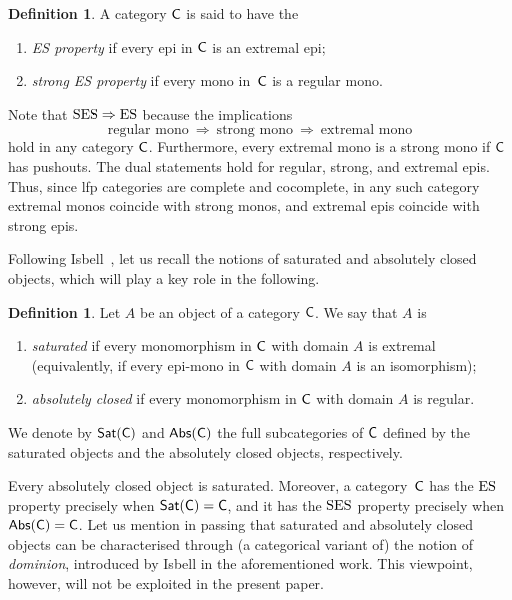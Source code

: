 \documentclass[a4paper,10pt,reqno]{amsart}
\theoremstyle{definition}
\newtheorem{definition}[theorem]{Definition}
\theoremstyle{remark}
\newcommand{\cat}{{\sf C}}								%
\newcommand{\Sat}{{\sf Sat}}								%
\newcommand{\Abs}{{\sf Abs}}								%
\newcommand{\IMP}{\Rightarrow}						%
\newcommand{\ES}{\textnormal{ES}}
\newcommand{\SES}{\textnormal{SES}}
\begin{document}
\begin{definition}\label{d:ES-and-SES}
A category $\cat$ is said to have the
\begin{enumerate}
\item[(\ES)]\label{ES} \emph{ES property} if every epi in $\cat$ is an extremal epi;
\item[(\SES)]\label{SES} \emph{strong ES property} if every mono in~$\cat$ is a regular mono.
\end{enumerate}
\end{definition}

Note that $\SES\IMP\ES$ because the implications
\[
\text{regular mono} \ \IMP \ \text{strong mono} \ \IMP \ \text{extremal mono}
\]
hold in any category $\cat$. Furthermore, every extremal mono is a strong mono if $\cat$ has pushouts. The dual statements hold for regular, strong, and extremal epis. Thus, since lfp categories are complete and cocomplete, in any such category extremal monos coincide with strong monos, and extremal epis coincide with strong epis.


Following Isbell~\cite{Isbell1966}, let us recall the notions of saturated and absolutely closed objects, which will play a key role in the following.

\begin{definition}
Let $A$ be an object of a category $\cat$. We say that $A$ is
\begin{enumerate}[label=(\roman*)]
\item \emph{saturated} if every monomorphism in $\cat$ with domain $A$ is extremal (equivalently, if every epi-mono in $\cat$ with domain $A$ is an isomorphism);
\item \emph{absolutely closed} if every monomorphism in $\cat$ with domain $A$ is regular.
\end{enumerate}
We denote by $\Sat(\cat)$ and $\Abs(\cat)$ the full subcategories of $\cat$ defined by the saturated objects and the absolutely closed objects, respectively.
\end{definition}

Every absolutely closed object is saturated. Moreover, a category~$\cat$ has the $\ES$ property precisely when $\Sat(\cat)=\cat$, and it has the $\SES$ property precisely when $\Abs(\cat)=\cat$. Let us mention in passing that saturated and absolutely closed objects can be characterised through (a categorical variant of) the notion of \emph{dominion}, introduced by Isbell in the aforementioned work. This viewpoint, however, will not be exploited in the present paper.
\end{document}
